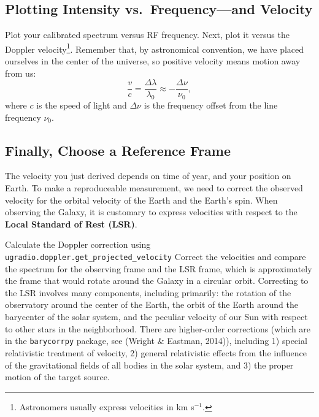 \documentclass[11pt,preprint]{aastex}
\begin{document}
\subsection{Plotting Intensity vs.\ Frequency---and Velocity}

\noindent
Plot your calibrated spectrum versus RF frequency. Next,
plot it versus the Doppler velocity\footnote{Astronomers usually express
  velocities in km s$^{-1}$.}.  Remember that, by astronomical
convention, we have placed ourselves in the center of the universe, so positive velocity means motion away from us:
\begin{equation}
\frac{v}{c}=\frac{\Delta\lambda}{\lambda_0} \approx -\frac{\Delta \nu}{\nu_0},
\end{equation}
where $c$ is the speed of light and $\Delta \nu$ is the frequency
offset from the line frequency $\nu_0$.

\subsection{Finally, Choose a Reference Frame}

\noindent
The velocity you just derived depends on time of year, and your position on Earth.
To make a reproduceable measurement, we need
to correct the observed velocity for the orbital velocity of the Earth
and the Earth's spin. When observing the Galaxy, it is
customary to express velocities with respect to the {\bf Local Standard of
Rest (LSR)}.

Calculate the Doppler correction using {\tt ugradio.doppler.get\_projected\_velocity} 
Correct the velocities and compare the spectrum for the observing frame
and the LSR frame, which is approximately the frame that would rotate
around the Galaxy in a circular orbit.  Correcting to the LSR involves many components,
including primarily: the rotation of the observatory around the center of the Earth, the
orbit of the Earth around the barycenter of the solar system, and the peculiar velocity
of our Sun with respect to other stars in the neighborhood.  There are higher-order
corrections (which are in the {\tt barycorrpy} package, 
see (Wright \& Eastman, 2014)), including 1) special relativistic treatment of velocity,
2) general relativistic effects from the influence of the gravitational fields of all bodies
in the solar system, and 3) the proper motion of the target source.
\end{document}

